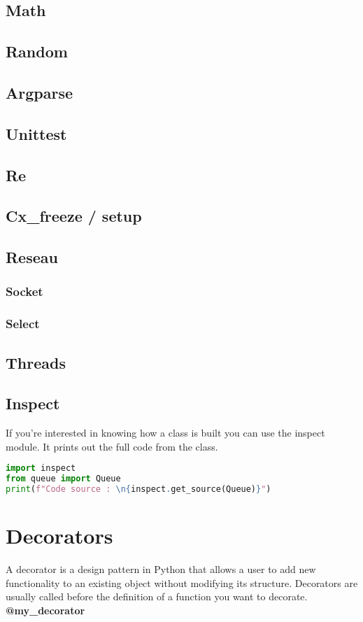 \documentclass[a4paper, 12pt]{article}
\begin{document}
\subsection{Math}
\subsection{Random}
\subsection{Argparse}
\subsection{Unittest}
\subsection{Re}
\subsection{Cx\_freeze / setup}
\subsection{Reseau}
\subsubsection{Socket}
\subsubsection{Select}
\subsection{Threads}
\subsection{Inspect}
If you're interested in knowing how a class is built you can use the inspect module. It prints out the full code from the class.
\begin{lstlisting}[language=Python]
import inspect
from queue import Queue
print(f"Code source : \n{inspect.get_source(Queue)}")
\end{lstlisting}

\newpage
\section{Decorators}
A decorator is a design pattern in Python that allows a user to add new functionality to an existing object without modifying its structure. Decorators are usually called before the definition of a function you want to decorate. \textbf{@my\_decorator}\newline
\end{document}
